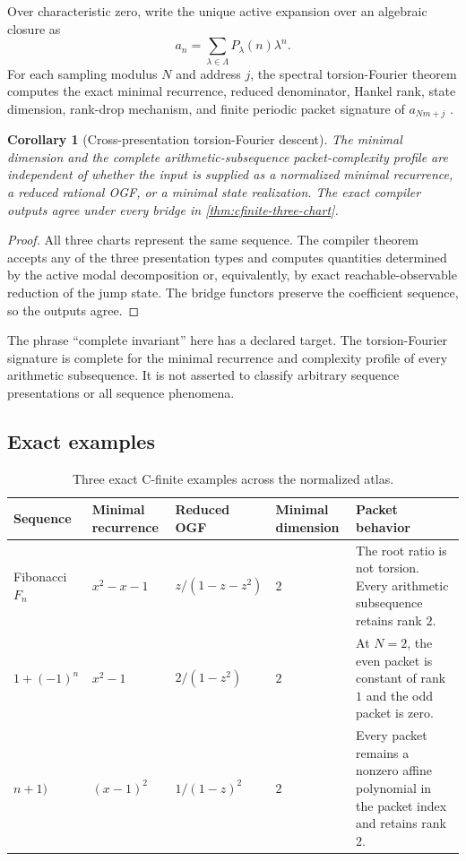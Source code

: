 \documentclass[11pt]{article}
\newtheorem{corollary}[theorem]{Corollary}
\theoremstyle{definition}
\theoremstyle{remark}
\begin{document}
Over characteristic zero, write the unique active expansion over an algebraic closure as
\[
a_n=\sum_{\lambda\in\Lambda}P_\lambda(n)\lambda^n.
\]
For each sampling modulus \(N\) and address \(j\), the spectral torsion-Fourier theorem computes the exact minimal recurrence, reduced denominator, Hankel rank, state dimension, rank-drop mechanism, and finite periodic packet signature of \(a_{Nm+j}\) \cite{SEQ}.

\begin{corollary}[Cross-presentation torsion-Fourier descent]
The minimal dimension and the complete arithmetic-subsequence packet-complexity profile are independent of whether the input is supplied as a normalized minimal recurrence, a reduced rational OGF, or a minimal state realization. The exact compiler outputs agree under every bridge in \cref{thm:cfinite-three-chart}.
\end{corollary}

\begin{proof}
All three charts represent the same sequence. The compiler theorem accepts any of the three presentation types and computes quantities determined by the active modal decomposition or, equivalently, by exact reachable-observable reduction of the jump state. The bridge functors preserve the coefficient sequence, so the outputs agree.
\end{proof}

The phrase ``complete invariant'' here has a declared target. The torsion-Fourier signature is complete for the minimal recurrence and complexity profile of every arithmetic subsequence. It is not asserted to classify arbitrary sequence presentations or all sequence phenomena.

\subsection{Exact examples}

\begin{table}[htbp]
\centering
\caption{Three exact C-finite examples across the normalized atlas.}
\label{tab:cfinite-examples}
\small
\begin{tabularx}{\textwidth}{@{}L{0.18\textwidth}L{0.19\textwidth}L{0.19\textwidth}L{0.15\textwidth}Y@{}}
\toprule
Sequence & Minimal recurrence & Reduced OGF & Minimal dimension & Packet behavior\\
\midrule
Fibonacci \(F_n\) & \(x^2-x-1\) & \(z/(1-z-z^2)\) & \(2\) & The root ratio is not torsion. Every arithmetic subsequence retains rank \(2\).\\
\(1+(-1)^n\) & \(x^2-1\) & \(2/(1-z^2)\) & \(2\) & At \(N=2\), the even packet is constant of rank \(1\) and the odd packet is zero.\\
\(n+1)\) & \((x-1)^2\) & \(1/(1-z)^2\) & \(2\) & Every packet remains a nonzero affine polynomial in the packet index and retains rank \(2\).\\
\bottomrule
\end{tabularx}
\end{table}
\end{document}

